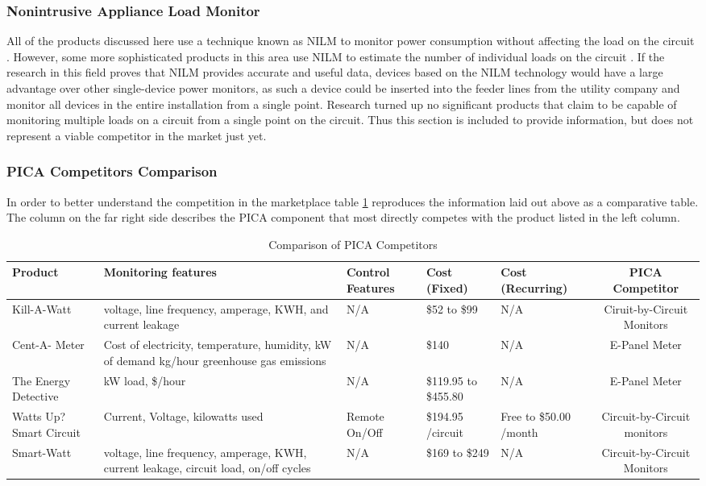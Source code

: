 \subsubsection{Nonintrusive Appliance Load Monitor} %
All of the products discussed here use a technique known as \ac{NILM} to monitor power consumption without affecting the load on the circuit \cite{NILM}. However, some more sophisticated products in this area use \ac{NILM} to estimate the number of individual loads on the circuit \cite{NALM}. If the research in this field proves that \ac{NILM} provides accurate and useful data, devices based on the \ac{NILM} technology would have a large advantage over other single-device power monitors, as such a device could be inserted into the feeder lines from the utility company and monitor all devices in the entire installation from a single point. Research turned up no significant products that claim to be capable of monitoring multiple loads on a circuit from a single point on the circuit. Thus this section is included to provide information, but does not represent a viable competitor in the market just yet.

\subsubsection{PICA Competitors Comparison} %
In order to better understand the competition in the marketplace table \ref{tab:competition_sum} reproduces the information laid out above as a comparative table. The column on the far right side describes the PICA component that most directly competes with the product listed in the left column.

\begin{table}[htdp]
\caption{Comparison of PICA Competitors}
\begin{center}
\begin{tabular}{|>{\centering}b{0.75in}|>{\raggedright}b{1.25in}|>{\raggedright}b{1in}|>{\raggedright}b{0.5in}|>{\raggedright}b{0.5in}|c|}\hline
\rowcolor{lightgray}Product & Monitoring features & Control Features & Cost (Fixed) & Cost (Recurring) & PICA Competitor\\\hline
Kill-A-Watt & voltage, line frequency, amperage, KWH, and current leakage & N/A & \$52 to \$99 & N/A & Ciruit-by-Circuit Monitors\\\hline 
Cent-A- Meter & Cost of electricity, temperature, humidity, kW of demand kg/hour greenhouse gas emissions & N/A & \$140 & N/A & E-Panel Meter\\\hline 
The Energy Detective & kW load, \$/hour & N/A & \$119.95 to \$455.80 & N/A & E-Panel Meter\\\hline
Watts Up? Smart Circuit & Current, Voltage, kilowatts used & Remote On/Off & \$194.95 /circuit & Free to \$50.00 /month & Circuit-by-Circuit monitors\\\hline
Smart-Watt & voltage, line frequency, amperage, KWH, current leakage, circuit load, on/off cycles & N/A & \$169 to \$249  & N/A & Circuit-by-Circuit Monitors\\\hline
\end{tabular}
\end{center}
\label{tab:competition_sum}
\end{table}%

